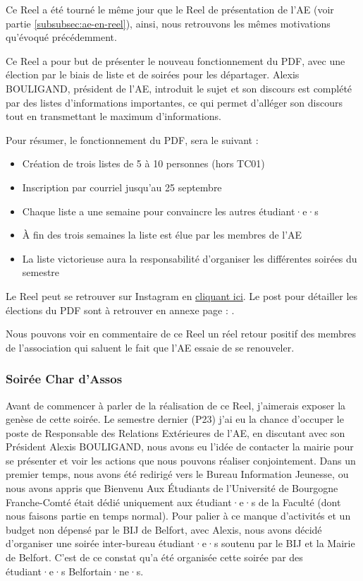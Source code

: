 Ce Reel a été tourné le même jour que le Reel de présentation de l'AE (voir partie \ref{subsubsec:ae-en-reel}), ainsi, nous retrouvons les mêmes motivations qu'évoqué précédemment.

Ce Reel a pour but de présenter le nouveau fonctionnement du \gls{PDF}, avec une élection par le biais de liste et de soirées pour les départager.
Alexis BOULIGAND, président de l'\gls{AE}, introduit le sujet et son discours est complété par des listes d'informations importantes, ce qui permet d'alléger son discours tout en transmettant le maximum d'informations.

Pour résumer, le fonctionnement du \gls{PDF}, sera le suivant :
\begin{itemize}
    \item Création de trois listes de 5 à 10 personnes (hors TC01)
    \item Inscription par courriel jusqu'au 25 septembre
    \item Chaque liste a une semaine pour convaincre les autres étudiant·e·s
    \item À fin des trois semaines la liste est élue par les membres de l'\gls{AE}
    \item La liste victorieuse aura la responsabilité d'organiser les différentes soirées du semestre
\end{itemize}

Le Reel peut se retrouver sur Instagram en \href{https://www.instagram.com/reel/CxQtgEXMqon/?utm_source=ig_web_copy_link&igshid=MzRlODBiNWFlZA==}{cliquant ici}.
Le post pour détailler les élections du \gls{PDF} sont à retrouver en annexe page : \pageref{subsec:interface-instagram}.

Nous pouvons voir en commentaire de ce Reel un réel retour positif des membres de l'association qui saluent le fait que l'\gls{AE} essaie de se renouveler.

\subsubsection{Soirée Char d'Assos}

Avant de commencer à parler de la réalisation de ce Reel, j'aimerais exposer la genèse de cette soirée.
Le semestre dernier (P23) j'ai eu la chance d'occuper le poste de Responsable des Relations Extérieures de l'\gls{AE}, en discutant avec son Président Alexis BOULIGAND, nous avons eu l'idée de contacter la mairie pour se présenter et voir les actions que nous pouvons réaliser conjointement.
Dans un premier temps, nous avons été redirigé vers le Bureau Information Jeunesse, ou nous avons appris que Bienvenu Aux Étudiants de l'Université de Bourgogne Franche-Comté était dédié uniquement aux étudiant·e·s de la Faculté (dont nous faisons partie en temps normal).
Pour palier à ce manque d'activités et un budget non dépensé par le BIJ de Belfort, avec Alexis, nous avons décidé d'organiser une soirée inter-bureau étudiant·e·s soutenu par le BIJ et la Mairie de Belfort.
C'est de ce constat qu'a été organisée cette soirée par des étudiant·e·s Belfortain·ne·s.

